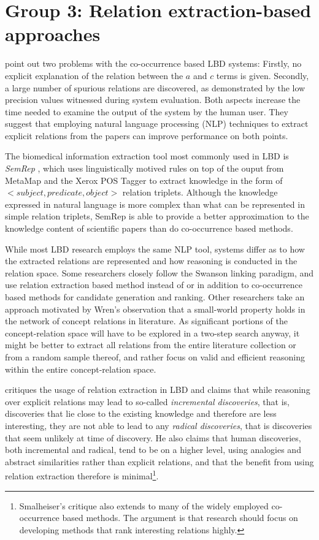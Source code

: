 \section{Group 3: Relation extraction-based approaches}
\label{sec:relex}	

\citet{hri06} point out two problems with the co-occurrence based LBD systems: Firstly, no explicit explanation of the relation between the $a$ and $c$ terms is given. Secondly, a large number of spurious relations are discovered, as demonstrated by the low precision values witnessed during system evaluation. Both aspects increase the time needed to examine the output of the system by the human user. They suggest that employing natural language processing (NLP) techniques to extract explicit relations from the papers can improve performance on both points.

The biomedical information extraction tool most commonly used in LBD is \emph{SemRep} \cite{rin03}, which uses linguistically motived rules on top of the ouput from MetaMap and the Xerox POS Tagger to extract knowledge in the form of $<subject, predicate, object>$ relation triplets. Although the knowledge expressed in natural language is more complex than what can be represented in simple relation triplets, SemRep is able to provide a better approximation to the knowledge content of scientific papers than do co-occurrence based methods.

While most LBD research employs the same NLP tool, systems differ as to how the extracted relations are represented and how reasoning is conducted in the relation space. Some researchers closely follow the Swanson linking paradigm, and use relation extraction based method instead of or in addition to co-occurrence based methods for candidate generation and ranking. Other researchers take an approach motivated by Wren's observation that a small-world property holds in the network of concept relations in literature. As significant portions of the concept-relation space will have to be explored in a two-step search anyway, it might be better to extract all relations from the entire literature collection or from a random sample thereof, and rather focus on valid and efficient reasoning within the entire concept-relation space. 

\citet{sma12} critiques the usage of relation extraction in LBD and claims that while reasoning over explicit relations may lead to so-called \emph{incremental discoveries}, that is, discoveries that lie close to the existing knowledge and therefore are less interesting, they are not able to lead to any \emph{radical discoveries}, that is discoveries that seem unlikely at time of discovery. He also claims that human discoveries, both incremental and radical, tend to be on a higher level, using analogies and abstract similarities rather than explicit relations, and that the benefit from using relation extraction therefore is minimal\footnote{Smalheiser's critique also extends to many of the widely employed co-occurrence based methods. The argument is that research should focus on developing methods that rank interesting relations highly.}.

